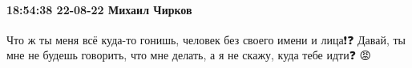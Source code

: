  
 
 
 
 

\paragraph{18:54:38 22-08-22 Михаил Чирков}
Что ж ты меня всё куда-то гонишь, человек без своего имени и лица❗️❓
Давай, ты мне не будешь говорить, что мне делать, а я не скажу, куда тебе идти❓ 😡
